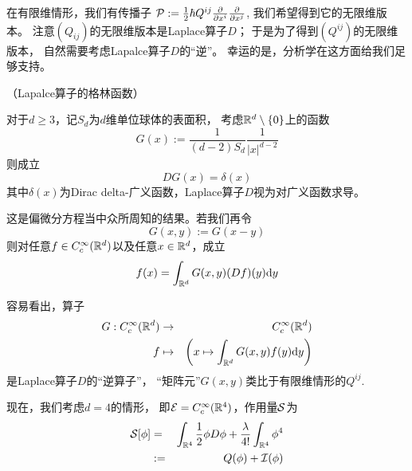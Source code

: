 在有限维情形，我们有传播子
$\mathcal{P}:=\frac{1}{2}\hbar Q^{ij}\frac{\partial } {\partial x^i}\frac{\partial } {\partial x^j}$,
我们希望得到它的无限维版本。
注意$(Q_{ij})$的无限维版本是Laplace算子$D$；
于是为了得到$(Q^{ij})$的无限维版本，
自然需要考虑Lapalce算子$D$的“逆”。
幸运的是，分析学在这方面给我们足够支持。

\begin{lemma}（Lapalce算子的格林函数）

对于$d\geq 3$，记$S_d$为$d$维单位球体的表面积，
考虑$\mathbb{R}^d\setminus\{0\}$上的函数
$$G(x):=\frac{1}{(d-2)S_d}
        \frac{1}{|x|^{d-2}}
$$
则成立
$$DG(x)=\delta(x)$$
其中$\delta(x)$为Dirac delta-广义函数，Laplace算子$D$视为对广义函数求导。
\end{lemma}

这是偏微分方程当中众所周知的结果。若我们再令
$$G(x,y):=G(x-y)$$
则对任意$f\in C^\infty_c(\mathbb{R}^d)$以及任意$x\in\mathbb{R}^d$，成立
$$
  f(x)=\int_{\mathbb{R}^d}
         G(x,y)(Df)(y)
         \mathrm{d} y
$$

容易看出，算子
\begin{eqnarray*}
G:C^\infty_c(\mathbb{R}^d) &\to& C^\infty_c(\mathbb{R}^d)\\
f&\mapsto&\left(
            x\mapsto\int_{\mathbb{R}^d}G(x,y)f(y)\mathrm{d} y
          \right)
\end{eqnarray*}
是Laplace算子$D$的“逆算子”，
“矩阵元”$G(x,y)$类比于有限维情形的$Q^{ij}$.



\vs

现在，我们考虑$d=4$的情形，
即$\mathcal{E}=C^{\infty}_c(\mathbb{R}^4)$，作用量$\mathcal{S}$为
\begin{eqnarray*}
     \mathcal{S}[\phi]
&=&
     \int_{\mathbb{R}^4}
       \frac{1}{2}\phi D\phi
      +\frac{\lambda}{4!}\int_{\mathbb{R}^4}\phi^4\\
&:=&
     Q(\phi)+\mathcal{I}(\phi)
\end{eqnarray*}

